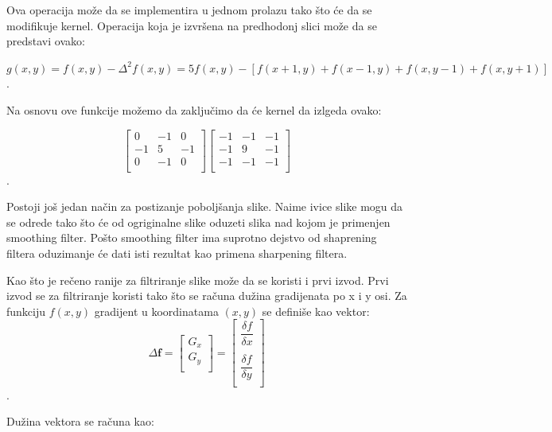 \documentclass[a4paper,12pt,titlepage]{article}
\begin{document}
Ova operacija može da se implementira u jednom prolazu tako što će da se modifikuje kernel. Operacija koja je izvršena na predhodonj slici može da se predstavi ovako:

\begin{center}
$g(x, y) = f(x, y) - \Delta^{2}f(x, y) = 5f(x, y) - [f(x + 1, y) + f(x - 1, y) + f(x, y - 1) + f(x, y + 1)]$.\\
\end{center} 

Na osnovu ove funkcije možemo da zaključimo da će kernel da izlgeda ovako:

\[
\begin{bmatrix}
     0 & -1 & 0 \\
     -1 & 5 & -1 \\
     0 & -1 & 0 \\
\end{bmatrix}
\begin{bmatrix}
     -1 & -1 & -1 \\
     -1 & 9 & -1 \\
     -1 & -1 & -1 \\
\end{bmatrix}
\]. 

Postoji još jedan način za postizanje poboljšanja slike. Naime ivice slike mogu da se odrede tako što će od ogriginalne slike oduzeti slika nad kojom je primenjen smoothing filter. Pošto smoothing filter ima suprotno dejstvo od shaprening filtera oduzimanje će dati isti rezultat kao primena sharpening filtera. 

Kao što je rečeno ranije za filtriranje slike može da se koristi i prvi izvod. Prvi izvod se za filtriranje koristi tako što se računa dužina gradijenata po x i y osi. Za funkciju $f(x, y)$ gradijent u koordinatama $(x, y)$ se definiše kao vektor: \\

\[
\Delta \textbf{f}
=
\begin{bmatrix}
     G_{x} \\
     G_{y} \\
\end{bmatrix}
=
\begin{bmatrix}
     \dfrac{\delta f}{\delta x} \\
     \\
     \dfrac{\delta f}{\delta y} \\
\end{bmatrix}
\]. 

Dužina vektora se računa kao: 
\end{document}
